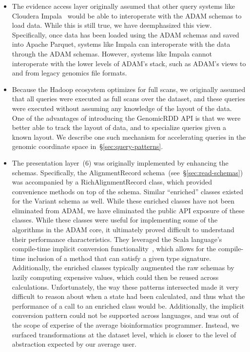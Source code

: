 \documentclass[phd]{ucbthesis}
\begin{document}
\begin{itemize}
\item The evidence access layer originally assumed that other query systems like
  {Cloudera Impala}~\cite{kornacker15} would be able to interoperate with
  the {ADAM} schemas to load data. While this is still true, we have
  deemphasized this view. Specifically, once data has been loaded using the
  {ADAM} schemas and saved into {Apache Parquet}, systems like
  {Impala} can interoperate with the data through the {ADAM}
  schemas. However, systems like {Impala} cannot interoperate with
  the lower levels of {ADAM}'s stack, such as {ADAM}'s views to
  and from legacy genomics file formats.
\item Because the {Hadoop} ecosystem optimizes for full scans, we
  originally assumed that all queries were executed as full scans over the
  dataset, and these queries were executed without assuming any knowledge of the
  layout of the data. One of the advantages of introducing the
  {GenomicRDD} API is that we were better able to track the layout of
  data, and to specialize queries given a known layout. We describe one such
  mechanism for accelerating queries in the genomic coordinate space
  in~\S\ref{sec:query-patterns}.
\item The presentation layer~(6) was originally implemented by enhancing the
  schemas. Specifically, the {AlignmentRecord}
  schema~(see~\S\ref{sec:read-schemas}) was accompanied by a
  {RichAlignmentRecord} class, which provided convenience methods on top
  of the schema. Similar ``enriched'' classes existed for the {Variant}
  schema as well. While these enriched classes have not been eliminated from
  {ADAM}, we have eliminated the public API exposure of these classes.
  While these classes were useful for implementing some of the algorithms in the
  {ADAM} core, it ultimately proved difficult to understand their
  performance characteristics. They leveraged the {Scala} language's
  compile-time implicit conversion functionality~\cite{odersky04}, which allows for
  the compile-time inclusion of a method that can satisfy a given type
  signature. Additionally, the enriched classes typically augmented the raw
  schemas by lazily computing expensive values, which could then be reused
  across calculations. Unfortunately, the way these patterns intersected made it
  very difficult to reason about when a state had been calculated, and thus what
  the performance of a call to an enriched class would be. Additionally, the
  implicit conversion pattern could not be supported across languages, and was
  out of the scope of experise of the average bioinformatics programmer.
  Instead, we surfaced transformations at the dataset level, which is closer to
  the level of abstraction expected by our average user.
\end{itemize}
\end{document}
